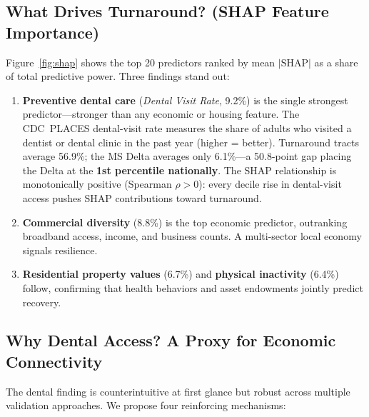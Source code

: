 \documentclass[10pt, letterpaper]{article}
\begin{document}
\subsection{What Drives Turnaround? (SHAP Feature Importance)}

Figure~\ref{fig:shap} shows the top 20 predictors ranked by mean
$|\text{SHAP}|$ as a share of total predictive power.  Three findings
stand out:

\begin{enumerate}[leftmargin=*, itemsep=2pt]
  \item \textbf{Preventive dental care} (\emph{Dental Visit Rate},
    9.2\%) is the single strongest predictor—stronger than any
    economic or housing feature.  The CDC~PLACES dental-visit rate
    measures the share of adults who visited a dentist or dental clinic
    in the past year (higher = better).  Turnaround tracts average
    56.9\%; the MS Delta averages only 6.1\%—a 50.8-point gap placing
    the Delta at the \textbf{1st percentile nationally}.  The SHAP
    relationship is monotonically positive (Spearman $\rho > 0$):
    every decile rise in dental-visit access pushes SHAP contributions
    toward turnaround.

  \item \textbf{Commercial diversity} (8.8\%) is the top economic
    predictor, outranking broadband access, income, and business
    counts.  A multi-sector local economy signals resilience.

  \item \textbf{Residential property values} (6.7\%) and
    \textbf{physical inactivity} (6.4\%) follow, confirming that
    health behaviors and asset endowments jointly predict recovery.
\end{enumerate}

\subsection*{Why Dental Access? A Proxy for Economic Connectivity}

The dental finding is counterintuitive at first glance but robust
across multiple validation approaches.  We propose four reinforcing
mechanisms:
\end{document}

